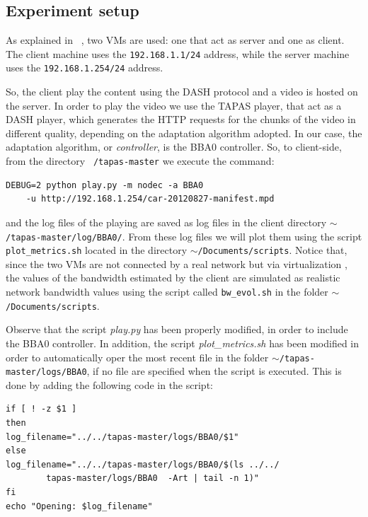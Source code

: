 \documentclass[a4paper]{report}
\begin{document}
\subsection{Experiment setup}
As explained in ~\citep{RamonAparicio}, two VMs are used: one that act as server and one as client. The client machine uses the \texttt{192.168.1.1/24} address, while the server machine uses the \texttt{192.168.1.254/24} address.

So, the client play the content using the DASH protocol and a video is hosted on the server. In order to play the video we use the TAPAS player, that act as a DASH player, which generates the HTTP requests for the chunks of the video in different quality, depending on the adaptation algorithm adopted. In our case, the adaptation algorithm, or \textit{controller}, is the BBA0 controller. So, to client-side, from the directory \texttt{~/tapas-master} we execute the command:

\begin{Verbatim}
DEBUG=2 python play.py -m nodec -a BBA0 
	-u http://192.168.1.254/car-20120827-manifest.mpd
\end{Verbatim} 

and the log files of the playing are saved as log files in the client directory \texttt{$\sim$\slash tapas-master\slash log\slash BBA0\slash}.
From these log files we will plot them using the script \texttt{plot\_metrics.sh} located in the directory \texttt{$\sim$\slash Documents\slash scripts}.
Notice that, since the two VMs are not connected by a real network but via virtualization , the values of the bandwidth estimated by the client are simulated as  realistic network bandwidth values using the script called \texttt{bw\_evol.sh} in the folder \texttt{$\sim$\slash Documents\slash scripts}.

Observe that the script \textit{play.py} has been properly modified, in order to include the BBA0 controller.
In addition, the script \textit{plot\_metrics.sh} has been modified in order to automatically oper the most recent file in the folder \texttt{$\sim$\slash tapas-master\slash logs\slash BBA0}, if no file are specified when the script is executed. This is done by adding the following code in the script:

\begin{Verbatim}
if [ ! -z $1 ]
then
log_filename="../../tapas-master/logs/BBA0/$1"
else
log_filename="../../tapas-master/logs/BBA0/$(ls ../../
		tapas-master/logs/BBA0  -Art | tail -n 1)"
fi
echo "Opening: $log_filename"
\end{Verbatim}
\end{document}
